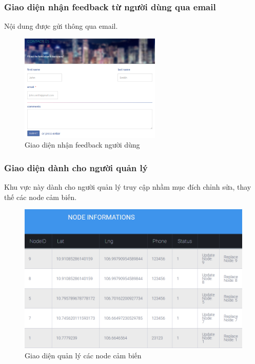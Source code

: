 \subsubsection*{Giao diện nhận feedback từ người dùng qua email}
Nội dung được gửi thông qua email.
	\begin{figure}[H]
		\centering    
		\includegraphics[width=0.6\textwidth]{web_email}
		\caption[Giao diện nhận feedback người dùng]{Giao diện nhận feedback người dùng}
		\label{fig:web_email}
	\end{figure}

\subsubsection*{Giao diện dành cho người quản lý}
Khu vực này dành cho người quản lý truy cập nhầm mục đích chỉnh sửa, thay thế các node cảm biến.
	\begin{figure}[H]
		\centering    
		\includegraphics[width=1\textwidth]{web_nodeinfo}
		\caption[Giao diện quản lý các node cảm biến]{Giao diện quản lý các node cảm biến}
		\label{fig:web_nodeinfo}
	\end{figure}
	








